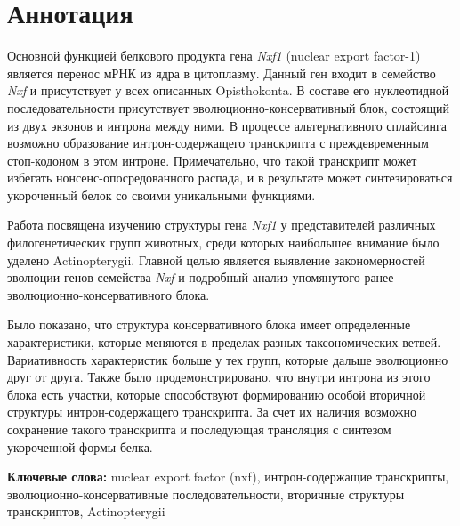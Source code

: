 \clearpage
\section*{Аннотация}

Основной функцией белкового продукта гена \textit{Nxf1} (nuclear export factor-1) является перенос мРНК из ядра в цитоплазму. Данный ген входит в семейство \textit{Nxf} и присутствует у всех описанных Opisthokonta. В составе его нуклеотидной последовательности присутствует эволюционно-консервативный блок, состоящий из двух экзонов и интрона между ними. В процессе альтернативного сплайсинга возможно образование интрон-содержащего транскрипта с преждевременным стоп-кодоном в этом интроне. Примечательно, что такой транскрипт может избегать нонсенс-опосредованного распада, и в результате может синтезироваться укороченный белок со своими уникальными функциями.

Работа посвящена изучению структуры гена \textit{Nxf1} у представителей различных филогенетических групп животных, среди которых наибольшее внимание было уделено Actinopterygii. Главной целью является выявление закономерностей эволюции генов семейства \textit{Nxf} и подробный анализ упомянутого ранее эволюционно-консервативного блока.

Было показано, что структура консервативного блока имеет определенные характеристики, которые меняются в пределах разных таксономических ветвей. Вариативность характеристик больше у тех групп, которые дальше эволюционно друг от друга. Также было продемонстрировано, что внутри интрона из этого блока есть участки, которые способствуют формированию особой вторичной структуры интрон-содержащего транскрипта. За счет их наличия возможно сохранение такого транскрипта и последующая трансляция с синтезом укороченной формы белка.

\vspace{1em}

\textbf{Ключевые слова:} nuclear export factor (nxf), интрон-содержащие транскрипты, эволюционно-консервативные последовательности, вторичные структуры транскриптов, Actinopterygii